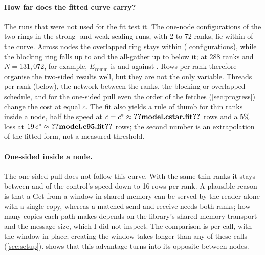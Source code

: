 \paragraph{How far does the fitted curve carry?} The runs that were not used for
the fit test it. The  one-node configurations of the two
rings in the strong- and weak-scaling runs, with 2 to 72 ranks, lie within
 of the curve. Across nodes the overlapped ring stays
within  (
configurations), while the blocking ring falls up to
 and the all-gather up to
 below it; at 288 ranks and $N=131{,}072$,
for example, $E_\text{comm}$ is  and
 against . Rows per rank
therefore organise the two-sided results well, but they are not the only variable.
Threads per rank (below), the network between the ranks, the blocking or
overlapped schedule, and for the one-sided pull even the order of the fetches
(\cref{sec:progress}) change the cost at equal $c$. The fit also yields a rule of
thumb for thin ranks inside a node, half the speed at $c=c^*\approx\n{model.cstar.fit}$
rows and a 5\% loss at $19\,c^*\approx\n{model.c95.fit}$ rows; the second number is an
extrapolation of the fitted form, not a measured threshold.

\paragraph{One-sided inside a node.} The one-sided pull does not follow this curve.
With the same thin ranks it stays between  and
 of the control's speed down to 16 rows per rank. A plausible
reason is that a Get from a window in shared memory can be served by the reader
alone with a single copy, whereas a matched send and receive needs both ranks;
how many copies each path makes depends on the library's shared-memory transport
and the message size, which I did not inspect. The comparison is per call, with
the window in place; creating the window takes longer than any of these calls
(\cref{sec:setup}).  shows that this
advantage turns into its opposite between nodes.

